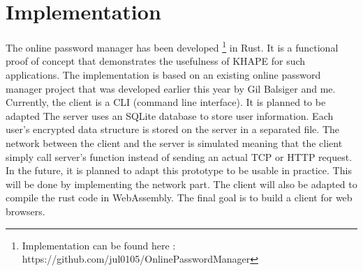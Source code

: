\documentclass[../report.tex]{subfiles}
\begin{document}
\section{Implementation}
% 

The online password manager has been developed \footnote{Implementation can be found here : https://github.com/jul0105/OnlinePasswordManager} in Rust. It is a functional proof of concept that demonstrates the usefulness of KHAPE for such applications.
The implementation is based on an existing online password manager project that was developed earlier this year by Gil Balsiger and me.
Currently, the client is a CLI (command line interface). It is planned to be adapted
The server uses an SQLite database to store user information. Each user's encrypted data structure is stored on the server in a separated file. 
The network between the client and the server is simulated meaning that the client simply call server’s function instead of sending an actual TCP or HTTP request.
In the future, it is planned to adapt this prototype to be usable in practice. This will be done by implementing the network part. The client will also be adapted to compile the rust code in WebAssembly. The final goal is to build a client for web browsers.
\end{document}
